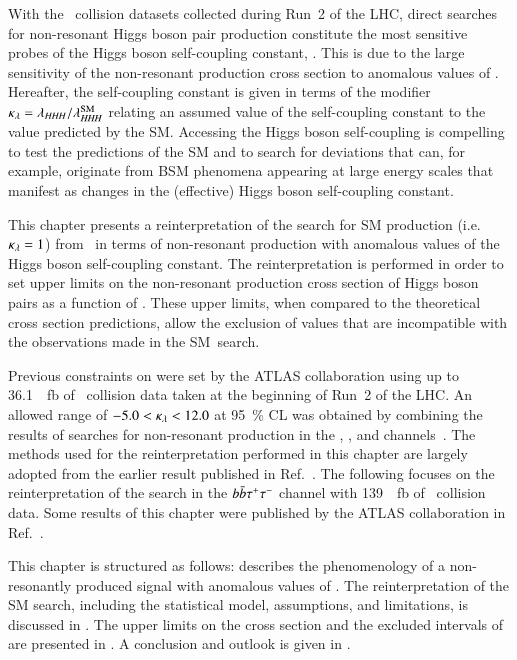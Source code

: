 With the \pp~collision datasets collected during Run~2 of the LHC,
direct searches for non-resonant Higgs boson pair production
constitute the most sensitive probes of the Higgs boson self-coupling
constant, \lambdahhh. This is due to the large sensitivity of the
non-resonant \HH production cross section to anomalous values of
\lambdahhh. Hereafter, the self-coupling constant is given in terms of the
modifier $\kappa_{\lambda} = \lambda_{H\mkern-1.5muH\mkern-1.5muH} / \lambda_{H\mkern-1.5muH\mkern-1.5muH}^{\text{SM}}$ relating an assumed
value of the self-coupling constant to the value predicted by the SM. Accessing
the Higgs boson self-coupling is compelling to test the predictions of the SM
and to search for deviations that can, for example, originate from BSM phenomena
appearing at large energy scales that manifest as changes in the (effective)
Higgs boson self-coupling constant.

This chapter presents a reinterpretation of the search for SM \HH production
(i.e.~$\kappa_{\lambda} = 1$) from~ in terms of non-resonant \HH
production with anomalous values of the Higgs boson self-coupling constant. The
reinterpretation is performed in order to set upper limits on the non-resonant
production cross section of Higgs boson pairs as a function of \klambda. These
upper limits, when compared to the theoretical cross section predictions, allow
the exclusion of \klambda values that are incompatible with the observations
made in the SM~\HH search.

Previous constraints on \klambda were set by the ATLAS collaboration using up to
\SI{36.1}{\per\femto\barn} of \pp~collision data taken at the beginning of Run~2
of the LHC. An allowed range of $-5.0 < \kappa_{\lambda} < 12.0$ at \SI{95}{\percent} CL
was obtained by combining the results of searches for non-resonant \HH
production in the \bbtautau, \bbbb, and \bbyy channels~\cite{HDBS-2018-58}. The
methods used for the reinterpretation performed in this chapter are largely
adopted from the earlier result published in Ref.~\cite{HDBS-2018-58}. The
following focuses on the reinterpretation of the search in the $b\bar{b}\tau^{+} \tau^{-}$
channel with \SI{139}{\per\femto\barn} of \pp~collision data. Some results of
this chapter were published by the ATLAS collaboration in
Ref.~\cite{ATLAS-CONF-2021-052}.

This chapter is structured as follows: 
describes the phenomenology of a non-resonantly produced \HH signal
with anomalous values of \klambda. The reinterpretation of the SM \HH
search, including the statistical model, assumptions, and limitations,
is discussed in . The upper limits on the
cross section and the excluded intervals of \klambda are presented in
. A conclusion and outlook is given
in .



